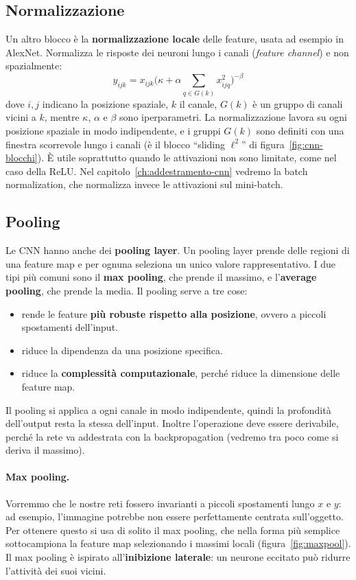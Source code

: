 \subsection{Normalizzazione}
Un altro blocco è la \textbf{normalizzazione locale} delle feature, usata ad esempio in AlexNet. Normalizza le risposte dei neuroni lungo i canali (\emph{feature channel}) e non spazialmente:
\[
y_{ijk} = x_{ijk}\Big(\kappa + \alpha \sum_{q \in G(k)} x_{ijq}^2\Big)^{-\beta}
\]
dove $i, j$ indicano la posizione spaziale, $k$ il canale, $G(k)$ è un gruppo di canali vicini a $k$, mentre $\kappa$, $\alpha$ e $\beta$ sono iperparametri. La normalizzazione lavora su ogni posizione spaziale in modo indipendente, e i gruppi $G(k)$ sono definiti con una finestra scorrevole lungo i canali (è il blocco ``sliding $\ell^2$'' di figura~\ref{fig:cnn-blocchi}). È utile soprattutto quando le attivazioni non sono limitate, come nel caso della ReLU. Nel capitolo~\ref{ch:addestramento-cnn} vedremo la batch normalization, che normalizza invece le attivazioni sul mini-batch.

\subsection{Pooling}\label{subsec:pooling}
Le CNN hanno anche dei \textbf{pooling layer}. Un pooling layer prende delle regioni di una feature map e per ognuna seleziona un unico valore rappresentativo. I due tipi più comuni sono il \textbf{max pooling}, che prende il massimo, e l'\textbf{average pooling}, che prende la media. Il pooling serve a tre cose:
\begin{itemize}
    \item rende le feature \textbf{più robuste rispetto alla posizione}, ovvero a piccoli spostamenti dell'input.
    \item riduce la dipendenza da una posizione specifica.
    \item riduce la \textbf{complessità computazionale}, perché riduce la dimensione delle feature map.
\end{itemize}
Il pooling si applica a ogni canale in modo indipendente, quindi la profondità dell'output resta la stessa dell'input. Inoltre l'operazione deve essere derivabile, perché la rete va addestrata con la backpropagation (vedremo tra poco come si deriva il massimo).

\paragraph{Max pooling.}
Vorremmo che le nostre reti fossero invarianti a piccoli spostamenti lungo $x$ e $y$: ad esempio, l'immagine potrebbe non essere perfettamente centrata sull'oggetto. Per ottenere questo si usa di solito il max pooling, che nella forma più semplice sottocampiona la feature map selezionando i massimi locali (figura~\ref{fig:maxpool}). Il max pooling è ispirato all'\textbf{inibizione laterale}: un neurone eccitato può ridurre l'attività dei suoi vicini.

